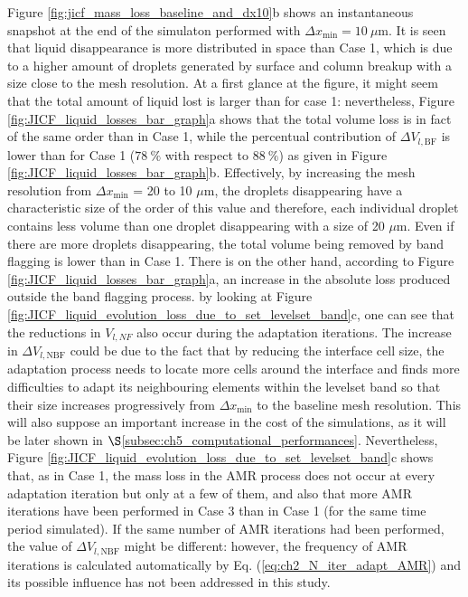 Figure \ref{fig:jicf_mass_loss_baseline_and_dx10}b shows an instantaneous snapshot at the end of the simulaton performed with $\Delta x_\mathrm{min} = 10~\mu$m. It is seen that liquid disappearance is more distributed in space than Case 1, which is due to a higher amount of droplets generated by surface and column breakup with a size close to the mesh resolution. At a first glance at the figure, it might seem that the total amount of liquid lost is larger than for case 1: nevertheless, Figure \ref{fig:JICF_liquid_losses_bar_graph}a shows that the total volume loss is in fact of the same order than in Case 1, while the percentual contribution of $\Delta V_{l,\mathrm{BF}}$ is lower than for Case 1 ($78~\%$ with respect to $88~\%$) as given in Figure  \ref{fig:JICF_liquid_losses_bar_graph}b. Effectively, by increasing the mesh resolution from $\Delta x_\mathrm{min}$ = 20 to 10 $\mu$m, the droplets disappearing have a characteristic size of the order of this value and therefore, each individual droplet contains less volume than one droplet disappearing with a size of 20 $\mu$m. Even if there are more droplets disappearing, the total volume being removed by band flagging is lower than in Case 1. There is on the other hand, according to Figure \ref{fig:JICF_liquid_losses_bar_graph}a, an increase in the absolute loss produced outside the band flagging process. by looking at Figure \ref{fig:JICF_liquid_evolution_loss_due_to_set_levelset_band}c, one can see that the reductions in $V_{l,NF}$ also occur during the adaptation iterations. The increase in $\Delta V_{l,\mathrm{NBF}}$ could be due to the fact that by reducing the interface cell size, the adaptation process needs to locate more cells around the interface and finds more difficulties to adapt its neighbouring elements within the levelset band so that their size increases progressively from $\Delta x_\mathrm{min}$ to the baseline mesh resolution. This will also suppose an important increase in the cost of the simulations, as it will be later shown in $\S$\ref{subsec:ch5_computational_performances}. Nevertheless, Figure \ref{fig:JICF_liquid_evolution_loss_due_to_set_levelset_band}c shows that, as in Case 1, the mass loss in the AMR process does not occur at every adaptation iteration but only at a few of them, and also that more AMR iterations have been performed in Case 3 than in Case 1 (for the same time period simulated). If the same number of AMR iterations had been performed, the value of $\Delta V_{l,\mathrm{NBF}}$ might be different: however, the frequency of AMR iterations is calculated automatically by Eq. (\ref{eq:ch2_N_iter_adapt_AMR}) and its possible influence has not been addressed in this study. 




